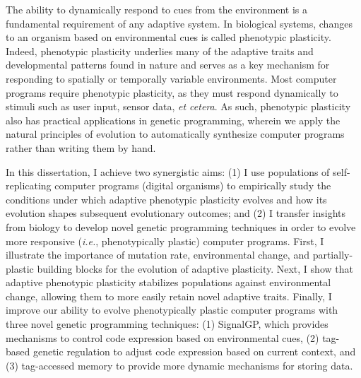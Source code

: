 
The ability to dynamically respond to cues from the environment is a fundamental requirement of any adaptive system.
In biological systems, changes to an organism based on environmental cues is called phenotypic plasticity.
Indeed, phenotypic plasticity underlies many of the adaptive traits and developmental patterns found in nature and serves as a key mechanism for responding to spatially or temporally variable environments.
Most computer programs require phenotypic plasticity, as they must respond dynamically to stimuli such as user input, sensor data, \textit{et cetera}. 
As such, phenotypic plasticity also has practical applications in genetic programming, wherein we apply the natural principles of evolution to automatically synthesize computer programs rather than writing them by hand.

In this dissertation, I achieve two synergistic aims: (1) I use populations of self-replicating computer programs (digital organisms) to empirically study the conditions under which adaptive phenotypic plasticity evolves and how its evolution shapes subsequent evolutionary outcomes; and (2) I transfer insights from biology to develop novel genetic programming techniques in order to evolve more responsive (\textit{i.e.}, phenotypically plastic) computer programs. 
First, I illustrate the importance of mutation rate, environmental change, and partially-plastic building blocks for the evolution of adaptive plasticity. 
Next, I show that adaptive phenotypic plasticity stabilizes populations against environmental change, allowing them to more easily retain novel adaptive traits. 
Finally, I improve our ability to evolve phenotypically plastic computer programs with three novel genetic programming techniques: 
(1) SignalGP, which provides mechanisms to control code expression based on environmental cues, (2) tag-based genetic regulation to adjust code expression based on current context, and (3) tag-accessed memory to provide more dynamic mechanisms for storing data.



